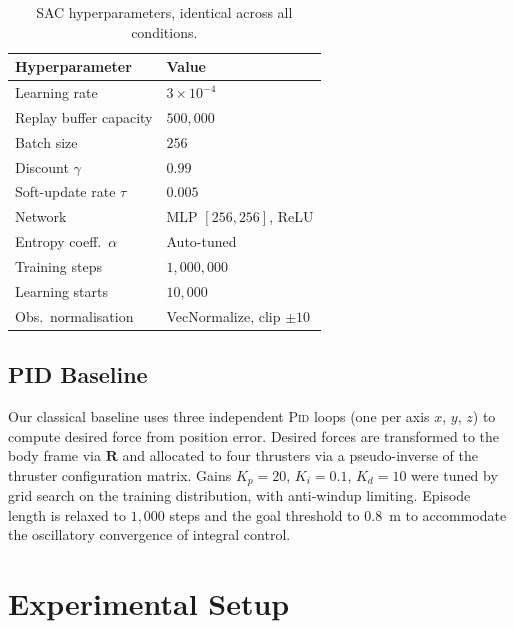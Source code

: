 \documentclass[letterpaper,10pt,journal]{IEEEtran}
\newcommand{\PID}{\textsc{Pid}\xspace}
\begin{document}
\begin{table}[!t]
  \centering
  \caption{SAC hyperparameters, identical across all conditions.}
  \label{tab:sac_params}
  \renewcommand{\arraystretch}{1.15}
  \begin{tabular}{ll}
    \toprule
    \textbf{Hyperparameter} & \textbf{Value} \\
    \midrule
    Learning rate                  & $3\times10^{-4}$ \\
    Replay buffer capacity         & $500{,}000$ \\
    Batch size                     & $256$ \\
    Discount $\gamma$              & $0.99$ \\
    Soft-update rate $\tau$        & $0.005$ \\
    Network                        & MLP $[256,256]$, ReLU \\
    Entropy coeff.\ $\alpha$       & Auto-tuned~\cite{haarnoja2018b} \\
    Training steps                 & $1{,}000{,}000$ \\
    Learning starts                & $10{,}000$ \\
    Obs.\ normalisation            & VecNormalize, clip $\pm10$ \\
    \bottomrule
  \end{tabular}
\end{table}

\subsection{PID Baseline}

Our classical baseline uses three independent \PID loops (one per axis
$x$, $y$, $z$) to compute desired force from position error.
Desired forces are transformed to the body frame via $\mathbf{R}$ and
allocated to four thrusters via a pseudo-inverse of the thruster
configuration matrix.
Gains $K_p=20$, $K_i=0.1$, $K_d=10$ were tuned by grid search on the
training distribution, with anti-windup limiting.
Episode length is relaxed to $1{,}000$ steps and the goal threshold to
$0.8$~m to accommodate the oscillatory convergence of integral control.

\section{Experimental Setup}
\label{sec:experiments}
\end{document}
